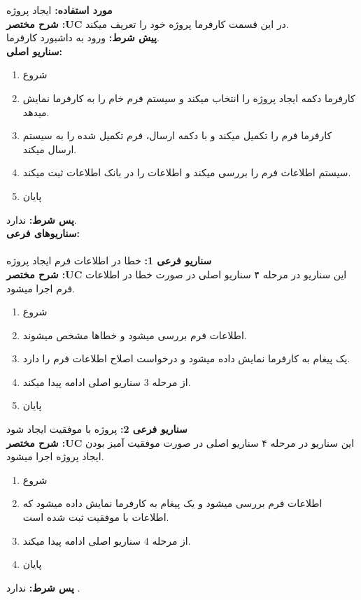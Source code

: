 \documentclass[20pt,a5paper]{report}
\begin{document}
\noindent \textbf{مورد استفاده:}
ایجاد پروژه
\\
\textbf{شرح مختصر :UC}
در این قسمت کارفرما پروژه خود را تعریف میکند.
\\
\textbf{پيش شرط:}
ورود به داشبورد کارفرما.
\\
\textbf{سناريو اصلی:}
\begin{enumerate}
\item
شروع
\item
کارفرما دکمه ایجاد پروژه را انتخاب میکند و سیستم فرم خام را به کارفرما نمایش میدهد.
\item
کارفرما فرم را تکمیل میکند و با دکمه ارسال، فرم تکمیل شده را به سیستم ارسال میکند.
\item
سیستم اطلاعات فرم را بررسی میکند و اطلاعات را در بانک اطلاعات ثبت میکند.
\item
پایان
\end{enumerate}
\textbf{پس شرط:}
ندارد.
\\
\textbf{سناريوهای فرعی:}
\\ \\
\textbf{سناريو فرعی 1:}
خطا در اطلاعات فرم ایجاد پروژه
\\
\textbf{شرح مختصر :UC}
این سناریو در مرحله ۴ سناریو اصلی در صورت خطا در اطلاعات فرم اجرا میشود.
\begin{enumerate}
\item
شروع
\item
اطلاعات فرم بررسی میشود و خطاها مشخص میشوند.
\item
یک پیغام به کارفرما نمایش داده میشود و درخواست اصلاح اطلاعات فرم را دارد.
\item
از مرحله 3 سناریو اصلی ادامه پیدا میکند.
\item
پایان
\end{enumerate}
\textbf{سناريو فرعی 2:}
پروژه با موفقیت ایجاد شود
\\
\textbf{شرح مختصر :UC}
این سناریو در مرحله ۴ سناریو اصلی در صورت موفقیت آمیز بودن ایجاد پروژه اجرا میشود.
\begin{enumerate}
\item
شروع
\item
اطلاعات فرم بررسی میشود و یک پیغام به کارفرما نمایش داده میشود که اطلاعات با موفقیت ثبت شده است.
\item
از مرحله 4 سناریو اصلی ادامه پیدا میکند.
\item
پایان
\end{enumerate}

\textbf{پس شرط:}
ندارد .


\centering
\vfill
\lr{\LaTeX}
\end{document}
